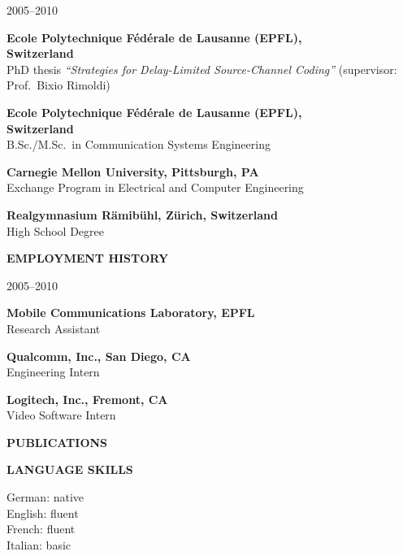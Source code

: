 {\raggedright 
\begin{cvlist}{2005--2010}
 \item[2005--2010] \textbf{Ecole Polytechnique F\'ed\'erale de Lausanne (EPFL),}\\ \textbf{Switzerland}\\
    PhD thesis \emph{``Strategies for Delay-Limited Source-Channel Coding''}
    (supervisor: Prof.~Bixio Rimoldi)
 \item[1999--2005] \textbf{Ecole Polytechnique F\'ed\'erale de Lausanne (EPFL),}\\ \textbf{Switzerland}\\
   B.Sc./M.Sc.\ in Communication Systems Engineering
  
 \item[2001--2002]  \textbf{Carnegie Mellon University, Pittsburgh, PA}\\
   Exchange Program in Electrical and Computer Engineering

 \item[1992--1999] \textbf{Realgymnasium R\"amib\"uhl, Z\"urich, Switzerland}\\
   High School Degree
 \end{cvlist}
 

\vspace{\baselineskip}
\noindent\textsf{\textbf{EMPLOYMENT HISTORY}}
\begin{cvlist}{2005--2010}
\item[2005--2010] \textbf{Mobile Communications Laboratory, EPFL}\\Research Assistant

\item[2004--2005] \textbf{Qualcomm, Inc., San Diego, CA}\\
  Engineering Intern

\item[2003\hss] \textbf{Logitech, Inc., Fremont, CA}\\ Video Software Intern
\end{cvlist}


\noindent\textsf{\textbf{PUBLICATIONS}}
\nobreak

{
\renewenvironment{thebibliography}[1]{\begin{enumerate}}{\end{enumerate}}
\renewcommand\bibitem[1]{\item}

}

\vspace{\baselineskip}
\noindent\textsf{\textbf{LANGUAGE SKILLS}}
\vspace{0.5\baselineskip}

\noindent
German: native\\
English: fluent\\
French: fluent\\
Italian: basic

}
